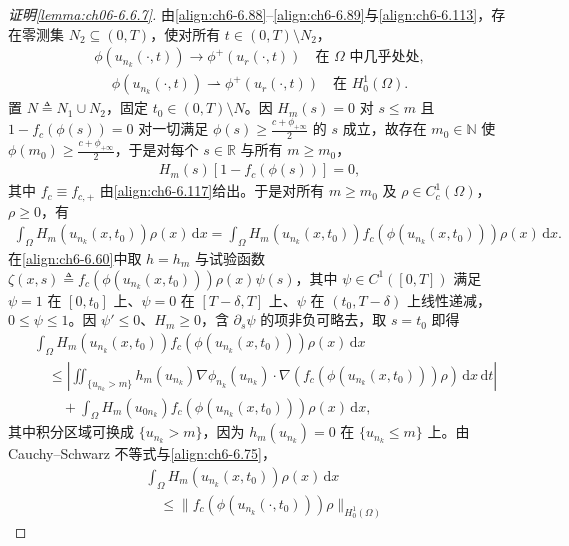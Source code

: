\documentclass[../../main.tex]{subfiles}%
\begin{document}
\begin{proof}[证明\cref{lemma:ch06-6.6.7}]
由\eqref{align:ch6-6.88}--\eqref{align:ch6-6.89}与\eqref{align:ch6-6.113}，存在零测集 $N_2\subseteq(0,T)$，使对所有 $t\in(0,T)\setminus N_2$，
\begin{align}
\phi(u_{n_k}(\cdot,t))\to\phi^+(u_r(\cdot,t)) \quad\text{在 }\Omega\text{ 中几乎处处}, \label{align:ch6-6.124a}
\end{align}
\begin{align}
\phi(u_{n_k}(\cdot,t))\rightharpoonup\phi^+(u_r(\cdot,t)) \quad\text{在 }H^1_0(\Omega). \label{align:ch6-6.124b}
\end{align}
置 $N\triangleq N_1\cup N_2$，固定 $t_0\in(0,T)\setminus N$。因 $H_m(s)=0$ 对 $s\leqslant m$ 且 $1-f_c(\phi(s))=0$ 对一切满足 $\phi(s)\geqslant\frac{c+\phi_{+\infty}}{2}$ 的 $s$ 成立，故存在 $m_0\in\mathbb{N}$ 使 $\phi(m_0)\geqslant\frac{c+\phi_{+\infty}}{2}$，于是对每个 $s\in\mathbb{R}$ 与所有 $m\geqslant m_0$，
\begin{align*}
H_m(s)[1-f_c(\phi(s))]=0,
\end{align*}
其中 $f_c\equiv f_{c,+}$ 由\eqref{align:ch6-6.117}给出。于是对所有 $m\geqslant m_0$ 及 $\rho\in C^1_c(\Omega)$，$\rho\geqslant0$，有
\begin{align*}
\int_\Omega H_m(u_{n_k}(x,t_0))\rho(x)\,\mathrm{d}x
=\int_\Omega H_m(u_{n_k}(x,t_0))f_c(\phi(u_{n_k}(x,t_0)))\rho(x)\,\mathrm{d}x.
\end{align*}
在\eqref{align:ch6-6.60}中取 $h=h_m$ 与试验函数 $\zeta(x,s)\triangleq f_c(\phi(u_{n_k}(x,t_0)))\rho(x)\psi(s)$，其中 $\psi\in C^1([0,T])$ 满足 $\psi=1$ 在 $[0,t_0]$ 上、$\psi=0$ 在 $[T-\delta,T]$ 上、$\psi$ 在 $(t_0,T-\delta)$ 上线性递减，$0\leqslant\psi\leqslant1$。因 $\psi'\leqslant0$、$H_m\geqslant0$，含 $\partial_s\psi$ 的项非负可略去，取 $s=t_0$ 即得
\begin{align*}
&\int_\Omega H_m(u_{n_k}(x,t_0))f_c(\phi(u_{n_k}(x,t_0)))\rho(x)\,\mathrm{d}x\\
&\quad\leqslant\left|\iint_{\{u_{n_k}>m\}}h_m(u_{n_k})\nabla\phi_{n_k}(u_{n_k})\cdot
\nabla(f_c(\phi(u_{n_k}(x,t_0)))\rho)\,\mathrm{d}x\,\mathrm{d}t\right|\\
&\qquad+\int_\Omega H_m(u_{0n_k})f_c(\phi(u_{n_k}(x,t_0)))\rho(x)\,\mathrm{d}x,
\end{align*}
其中积分区域可换成 $\{u_{n_k}>m\}$，因为 $h_m(u_{n_k})=0$ 在 $\{u_{n_k}\leqslant m\}$ 上。由 Cauchy--Schwarz 不等式与\eqref{align:ch6-6.75}，
\begin{align*}
&\int_\Omega H_m(u_{n_k}(x,t_0))\rho(x)\,\mathrm{d}x\\
&\quad\leqslant\|f_c(\phi(u_{n_k}(\cdot,t_0)))\rho\|_{H^1_0(\Omega)}

\end{align*}
\end{proof}
\end{document}
